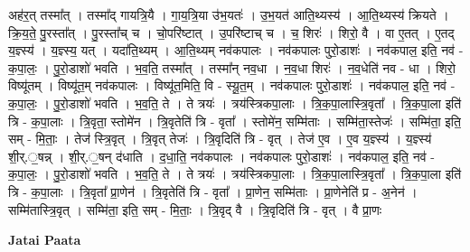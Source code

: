 \documentclass[17pt]{extarticle}
\begin{document}
अह॑र॒त् तस्मा᳚त् । तस्मा᳚द् गायत्रि॒यै । गा॒य॒त्रि॒या उ॑भ॒यतः॑ । उ॒भ॒यत॑ आति॒थ्यस्य॑ । आ॒ति॒थ्यस्य॑ क्रियते । क्रि॒य॒ते॒ पु॒रस्ता᳚त् । पु॒रस्ता᳚च् च । चो॒परि॑ष्टात् । उ॒परि॑ष्टाच् च । च॒ शिरः॑ । शिरो॒ वै । वा ए॒तत् । ए॒तद् य॒ज्ञ्स्य॑ । य॒ज्ञ्स्य॒ यत् । यदा॑ति॒थ्यम् । आ॒ति॒थ्यम् नव॑कपालः । नव॑कपालः पुरो॒डाशः॑ । नव॑कपाल॒ इति॒ नव॑ - क॒पा॒लः॒ । पु॒रो॒डाशो॑ भवति । भ॒व॒ति॒ तस्मा᳚त् । तस्मा᳚न् नव॒धा । न॒व॒धा शिरः॑ । न॒व॒धेति॑ नव - धा । शिरो॒ विष्यू॑तम् । विष्यू॑त॒म् नव॑कपालः । विष्यू॑त॒मिति॒ वि - स्यू॒त॒म् । नव॑कपालः पुरो॒डाशः॑ । नव॑कपाल॒ इति॒ नव॑ - क॒पा॒लः॒ । पु॒रो॒डाशो॑ भवति । भ॒व॒ति॒ ते । ते त्रयः॑ । त्रय॑स्त्रिकपा॒लाः । त्रि॒क॒पा॒लास्त्रि॒वृता᳚ । त्रि॒क॒पा॒ला इति॑ त्रि - क॒पा॒लाः । त्रि॒वृता॒ स्तोमे॑न । त्रि॒वृतेति॑ त्रि - वृता᳚ । स्तोमे॑न॒ सम्मि॑ताः । सम्मि॑ता॒स्तेजः॑ । सम्मि॑ता॒ इति॒ सम् - मि॒ताः॒ । तेज॑ स्त्रि॒वृत् । त्रि॒वृत् तेजः॑ । त्रि॒वृदिति॑ त्रि - वृत् । तेज॑ ए॒व । ए॒व य॒ज्ञ्स्य॑ । य॒ज्ञ्स्य॑ शी॒र्.॒षन्न् । शी॒र्.॒षन् द॑धाति । द॒धा॒ति॒ नव॑कपालः । नव॑कपालः पुरो॒डाशः॑ । नव॑कपाल॒ इति॒ नव॑ - क॒पा॒लः॒ । पु॒रो॒डाशो॑ भवति । भ॒व॒ति॒ ते । ते त्रयः॑ । त्रय॑स्त्रिकपा॒लाः । त्रि॒क॒पा॒लास्त्रि॒वृता᳚ । त्रि॒क॒पा॒ला इति॑ त्रि - क॒पा॒लाः । त्रि॒वृता᳚ प्रा॒णेन॑ । त्रि॒वृतेति॑ त्रि - वृता᳚ । प्रा॒णेन॒ सम्मि॑ताः । प्रा॒णेनेति॑ प्र - अ॒नेन॑ । सम्मि॑तास्त्रि॒वृत् । सम्मि॑ता॒ इति॒ सम् - मि॒ताः॒ । त्रि॒वृद् वै । त्रि॒वृदिति॑ त्रि - वृत् । वै प्रा॒णः \newline

\textbf{Jatai Paata} \newline
\end{document}

